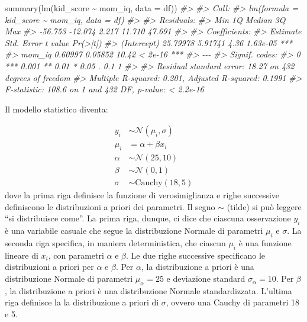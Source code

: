 \documentclass[
]{memoir}
\newenvironment{Shaded}{\begin{snugshade}}{\end{snugshade}}
\newcommand{\AttributeTok}[1]{\textcolor[rgb]{0.77,0.63,0.00}{#1}}
\newcommand{\CommentTok}[1]{\textcolor[rgb]{0.56,0.35,0.01}{\textit{#1}}}
\newcommand{\FunctionTok}[1]{\textcolor[rgb]{0.00,0.00,0.00}{#1}}
\newcommand{\NormalTok}[1]{#1}
\newcommand{\SpecialCharTok}[1]{\textcolor[rgb]{0.00,0.00,0.00}{#1}}
\begin{document}
\begin{Shaded}
\begin{Highlighting}[]
\FunctionTok{summary}\NormalTok{(}\FunctionTok{lm}\NormalTok{(kid\_score }\SpecialCharTok{\textasciitilde{}}\NormalTok{ mom\_iq, }\AttributeTok{data =}\NormalTok{ df))}
\CommentTok{\#\textgreater{} }
\CommentTok{\#\textgreater{} Call:}
\CommentTok{\#\textgreater{} lm(formula = kid\_score \textasciitilde{} mom\_iq, data = df)}
\CommentTok{\#\textgreater{} }
\CommentTok{\#\textgreater{} Residuals:}
\CommentTok{\#\textgreater{}     Min      1Q  Median      3Q     Max }
\CommentTok{\#\textgreater{} {-}56.753 {-}12.074   2.217  11.710  47.691 }
\CommentTok{\#\textgreater{} }
\CommentTok{\#\textgreater{} Coefficients:}
\CommentTok{\#\textgreater{}             Estimate Std. Error t value Pr(\textgreater{}|t|)    }
\CommentTok{\#\textgreater{} (Intercept) 25.79978    5.91741    4.36 1.63e{-}05 ***}
\CommentTok{\#\textgreater{} mom\_iq       0.60997    0.05852   10.42  \textless{} 2e{-}16 ***}
\CommentTok{\#\textgreater{} {-}{-}{-}}
\CommentTok{\#\textgreater{} Signif. codes:  }
\CommentTok{\#\textgreater{} 0 \textquotesingle{}***\textquotesingle{} 0.001 \textquotesingle{}**\textquotesingle{} 0.01 \textquotesingle{}*\textquotesingle{} 0.05 \textquotesingle{}.\textquotesingle{} 0.1 \textquotesingle{} \textquotesingle{} 1}
\CommentTok{\#\textgreater{} }
\CommentTok{\#\textgreater{} Residual standard error: 18.27 on 432 degrees of freedom}
\CommentTok{\#\textgreater{} Multiple R{-}squared:  0.201,  Adjusted R{-}squared:  0.1991 }
\CommentTok{\#\textgreater{} F{-}statistic: 108.6 on 1 and 432 DF,  p{-}value: \textless{} 2.2e{-}16}
\end{Highlighting}
\end{Shaded}

Il modello statistico diventa:

\[
\begin{aligned}
y_i &\sim \mathcal{N}(\mu_i, \sigma) \\
\mu_i &= \alpha + \beta x_i \\
\alpha &\sim \mathcal{N}(25, 10) \\
\beta &\sim \mathcal{N}(0, 1) \\
\sigma &\sim \text{Cauchy}(18, 5) 
\end{aligned}
\]
dove la prima riga definisce la funzione di verosimiglianza e righe successive definiscono le distribuzioni a priori dei parametri. Il segno \(\sim\) (tilde) si può leggere ``si distribuisce come''. La prima riga, dunque, ci dice che ciascuna osservazione \(y_i\) è una variabile casuale che segue la distribuzione Normale di parametri \(\mu_i\) e \(\sigma\). La seconda riga specifica, in maniera deterministica, che ciascun \(\mu_i\) è una funzione lineare di \(x_i\), con parametri \(\alpha\) e \(\beta\). Le due righe successive specificano le distribuzioni a priori per \(\alpha\) e \(\beta\). Per \(\alpha\), la distribuzione a priori è una distribuzione Normale di parametri \(\mu_{\alpha} = 25\) e deviazione standard \(\sigma_{\alpha} = 10\). Per \(\beta\), la distribuzione a priori è una distribuzione Normale standardizzata. L'ultima riga definisce la la distribuzione a priori di \(\sigma\), ovvero una Cauchy di parametri 18 e 5.
\end{document}
